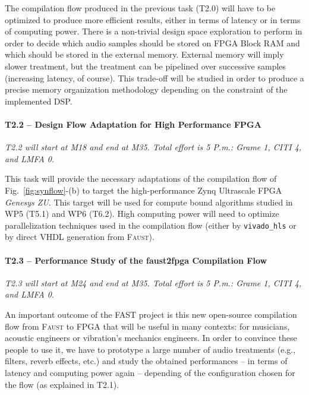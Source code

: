 \documentclass[a4paper,9pt]{extarticle}
\newcommand{\F}{\textsc{Faust}}
\newcommand{\PP}{FAST}
\newcommand{\projectname}[0]{\PP}
\begin{document}
The compilation flow produced in the previous task (T2.0) will have to be optimized to produce more efficient results, either in terms of latency or in terms of computing power. There is a non-trivial design space exploration to perform in order to decide which audio samples should be stored on FPGA Block RAM and which should be stored in the external memory. External memory will imply slower treatment, but the treatment can be pipelined over successive samples (increasing latency, of course). This trade-off will be studied in order to produce a precise memory organization methodology depending on the constraint of the implemented DSP.

\paragraph{T2.2 -- Design Flow Adaptation for High Performance FPGA}
\textit{T2.2 will start at M18 and end at M35. Total effort is 5 P.m.: Grame 1, CITI 4, and LMFA 0.}

This task will provide the necessary adaptations of the compilation flow of Fig.~\ref{fig:synflow}-(b) to target the high-performance Zynq Ultrascale FPGA {\em Genesys ZU}. This target will be used for compute bound algorithms studied in WP5 (T5.1) and WP6 (T6.2). High computing power will need to optimize parallelization techniques used in the compilation flow (either by {\tt vivado\_hls} or by direct VHDL generation from \F{}). 

\paragraph{T2.3 -- Performance Study of the faust2fpga Compilation Flow}
\textit{T2.3 will start at M24 and end at M35. Total effort is 5 P.m.: Grame 1, CITI 4, and LMFA 0.}

An important outcome of the {\projectname} project is this new open-source compilation flow from \F{} to FPGA that will be useful in many contexts: for musicians, acoustic engineers or  vibration's mechanics engineers. In order to convince these people to use it, we have to prototype a large number of audio treatments (e.g., filters, reverb effects, etc.) and study the obtained performances -- in terms of latency and computing power again -- depending of the configuration chosen for the flow (as explained in  T2.1).
\end{document}

